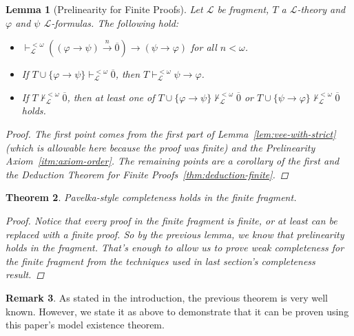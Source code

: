 \documentclass{amsart}
\newtheorem{theorem}{Theorem}[section]
\newtheorem{lemma}[theorem]{Lemma}
\theoremstyle{definition}
\newtheorem{remark}[theorem]{Remark}
\numberwithin{equation}{theorem}
\renewcommand{\phi}{\varphi}
\newcommand{\proves}{\vdash}
\newcommand{\rat}[1]{{\overline{#1}}}
\newcommand{\narrow}[1]{\xrightarrow{#1}}
\renewcommand{\to}{\narrow{}}
\newcommand{\frag}{\mathcal{L}}
\begin{document}
\begin{lemma}[Prelinearity for Finite Proofs]\label{lem:prelinearity-finite}
  Let $\frag$ be fragment, $T$ a $\frag$-theory and $\phi$ and $\psi$ $\frag$-formulas.
  The following hold:
  \begin{itemize}
  \item $\proves^{<\omega}_\frag((\phi\to\psi)\narrow{n}\rat 0)\to(\psi\to\phi)$ for all $n<\omega$.
  \item If $T\cup\{\phi\to\psi\}\proves^{<\omega}_\frag\rat 0$, then $T\proves^{<\omega}_\frag\psi\to\phi$.
  \item If $T\not\proves^{<\omega}_\frag\rat 0$, then at least one of $T\cup\{\phi\to\psi\}\not\proves^{<\omega}_\frag\rat 0$ or $T\cup\{\psi\to\phi\}\not\proves^{<\omega}_\frag\rat 0$ holds.
  \end{itemize}
  \begin{proof}
    The first point comes from the first part of Lemma~\ref{lem:vee-with-strict} (which is allowable here because the proof was finite) and the Prelinearity Axiom~\ref{itm:axiom-order}.
    The remaining points are a corollary of the first and the Deduction Theorem for Finite Proofs~\ref{thm:deduction-finite}.
  \end{proof}
\end{lemma}
\begin{theorem}
  Pavelka-style completeness holds in the finite fragment.
  \begin{proof}
    Notice that every proof in the finite fragment is finite, or at least can be replaced with a finite proof.
    So by the previous lemma, we know that prelinearity holds in the fragment.
    That's enough to allow us to prove weak completeness for the finite fragment from the techniques used in last section's completeness result.
  \end{proof}
\end{theorem}
\begin{remark}
  As stated in the introduction, the previous theorem is very well known.
  However, we state it as above to demonstrate that it can be proven using this paper's model existence theorem.
\end{remark}
\end{document}
